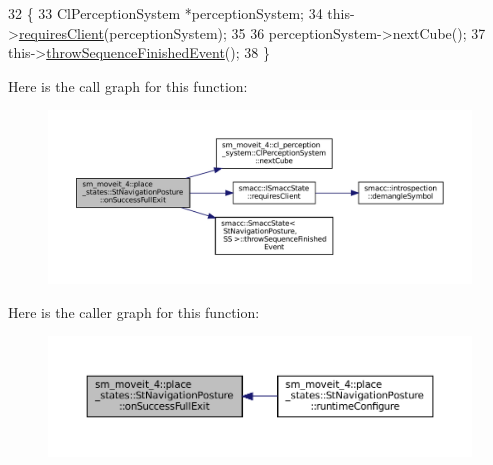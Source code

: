 \begin{DoxyCode}
32             \{
33                 ClPerceptionSystem *perceptionSystem;
34                 this->\hyperlink{classsmacc_1_1ISmaccState_a7f95c9f0a6ea2d6f18d1aec0519de4ac}{requiresClient}(perceptionSystem);
35 
36                 perceptionSystem->nextCube();
37                 this->\hyperlink{classsmacc_1_1SmaccState_a49dcfc25824f7e083dd4b999c49ab2b6}{throwSequenceFinishedEvent}();
38             \}
\end{DoxyCode}
Here is the call graph for this function\+:
\nopagebreak
\begin{figure}[H]
\begin{center}
\leavevmode
\includegraphics[width=350pt]{structsm__moveit__4_1_1place__states_1_1StNavigationPosture_a95ab74dae51538aeae46f71b515bc61e_cgraph}
\end{center}
\end{figure}
Here is the caller graph for this function\+:
\nopagebreak
\begin{figure}[H]
\begin{center}
\leavevmode
\includegraphics[width=350pt]{structsm__moveit__4_1_1place__states_1_1StNavigationPosture_a95ab74dae51538aeae46f71b515bc61e_icgraph}
\end{center}
\end{figure}
\mbox{\label{structsm__moveit__4_1_1place__states_1_1StNavigationPosture_aaf8ca02fa5a8185baf6bfc55731b1926}} 

